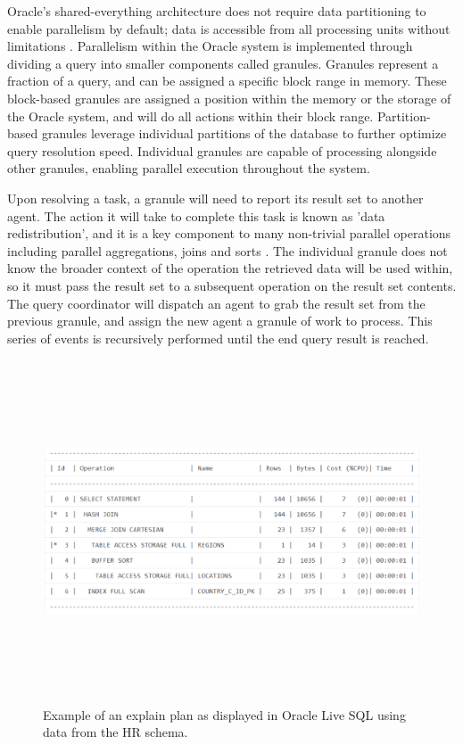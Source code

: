 \documentclass[onecolumn, draftclsnofoot,10pt, compsoc]{IEEEtran}
\begin{document}
Oracle’s shared-everything architecture does not require data partitioning to enable parallelism by default; data is accessible from all processing units without limitations \cite{OraclePEwODF}. 
Parallelism within the Oracle system is implemented through dividing a query into smaller components called granules.
Granules represent a fraction of a query, and can be assigned a specific block range in memory.
These block-based granules are assigned a position within the memory or the storage of the Oracle system, and will do all actions within their block range.
Partition-based granules leverage individual partitions of the database to further optimize query resolution speed.
Individual granules are capable of processing alongside other granules, enabling parallel execution throughout the system. 

Upon resolving a task, a granule will need to report its result set to another agent. 
The action it will take to complete this task is known as 'data redistribution', and it is a key component to many non-trivial parallel operations including parallel aggregations, joins and sorts \cite{OraclePEwODF}.
The individual granule does not know the broader context of the operation the retrieved data will be used within, so it must pass the result set to a subsequent operation on the result set contents.
The query coordinator will dispatch an agent to grab the result set from the previous granule, and assign the new agent a granule of work to process.
This series of events is recursively performed until the end query result is reached.

\begin{figure}[ht]
    \begin{center}
    \includegraphics[width=6in, height=4in, keepaspectratio]{nickREimage.eps}
    \caption{Example of an explain plan as displayed in Oracle Live SQL using data from the HR schema.}
    \end{center}
\end{figure}
\end{document}
